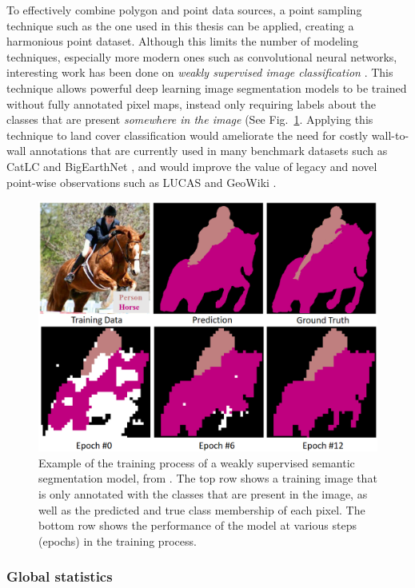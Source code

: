             To effectively combine polygon and point data sources, a point sampling technique such as the one used in this thesis can be applied, creating a harmonious point dataset. Although this limits the number of modeling techniques, especially more modern ones such as convolutional neural networks, interesting work has been done on \textit{weakly supervised image classification} \citep{huang2018weaklysupervised}. This technique allows powerful deep learning image segmentation models to be trained without fully annotated pixel maps, instead only requiring labels about the classes that are present \textit{somewhere in the image} (See Fig.\@~\ref{fig:weaklysupervised}. Applying this technique to land cover classification would ameliorate the need for costly wall-to-wall annotations that are currently used in many benchmark datasets such as CatLC \citep{garcia2022catlc} and BigEarthNet \citep{sumbul2021bigearthnet}, and would improve the value of legacy and novel point-wise observations such as LUCAS \citep{dandrimont2021lucas} and GeoWiki \citep{fritz2012geo}.

            \begin{figure}[H]
            \centering
            \includegraphics[width=0.5\linewidth]{figs_06/huang_person_horse.png}
            \caption{Example of the training process of a weakly supervised semantic segmentation model, from \citet{huang2018weaklysupervised}. The top row shows a training image that is only annotated with the classes that are present in the image, as well as the predicted and true class membership of each pixel. The bottom row shows the performance of the model at various steps (epochs) in the training process.}
            \label{fig:weaklysupervised}
            \end{figure}

        \subsubsection{Global statistics}

